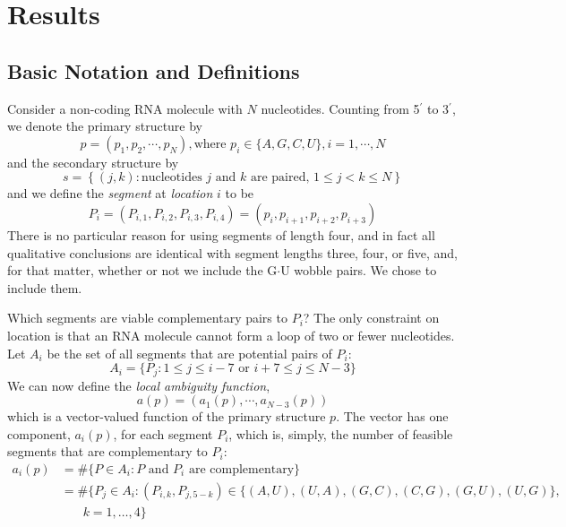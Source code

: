 \documentclass[10pt,letterpaper]{article}
\begin{document}
\section*{Results}

\subsection*{Basic Notation and Definitions}

Consider a non-coding RNA molecule with $N$ nucleotides.  Counting from 5$^\prime$ to 3$^\prime$, we denote the primary structure by
\begin{equation}
p = (p_1, p_2, \cdots, p_N)  , \text{where }p_i \in \{ A, G, C, U \}, i = 1, \cdots, N
\end{equation}
and the secondary structure by
\begin{equation}
s = \left\{ (j, k) :\text{nucleotides $j$ and $k$ are paired, $1 \leq j < k \leq N$} \right\}
\end{equation}
and we define the {\em segment} at {\em location} $i$ to be 
\begin{equation}
	P_i = (P_{i, 1}, P_{i, 2},P_{i, 3}, P_{i, 4}) = (p_i, p_{i + 1},p_{i + 2},p_{i + 3})
\end{equation}
There is no particular reason for using segments of length four, and in fact all qualitative conclusions are identical with segment lengths three, four, or five, 
and, for that matter, whether or not we include the G$\cdot$U wobble pairs. 
We chose to include them.

Which segments are viable complementary pairs to $P_i$? The only constraint on location is that an RNA molecule cannot form a loop of two or fewer nucleotides. Let $A_i$ be the set of all segments that are potential pairs of $P_i$:
\begin{equation}
A_i = \{P_j: 1 \leq j \leq i - 7 \text{ or }i + 7 \leq j \leq N - 3\}
\end{equation}
We can now define the {\em local ambiguity function}, 
\[
a(p) = (a_1(p), \cdots, a_{N - 3}(p))
\]
which is a vector-valued function of the primary structure $p$. The vector has  one component, $a_i(p)$, for each segment $P_i$, which is, simply, the number of feasible segments that are complementary to $P_i$:
\begin{align}
 a_i (p)& =  \# \{ P \in A_i : P \text{ and }P_i \text{ are complementary} \}  
 \label{eqn:LocalAmbiguity} \\
& = 
\#\big\{P_j\in A_i:  (P_{i, k}, P_{j, 5 - k}) \in \{ (A, U), (U, A), (G, C), (C, G), (G,U), (U,G) \},
\nonumber  \\
&  \ \ \ \ \ \ \ \ k=1,\ldots,4 \big\} 
\nonumber 
\end{align}
\end{document}
